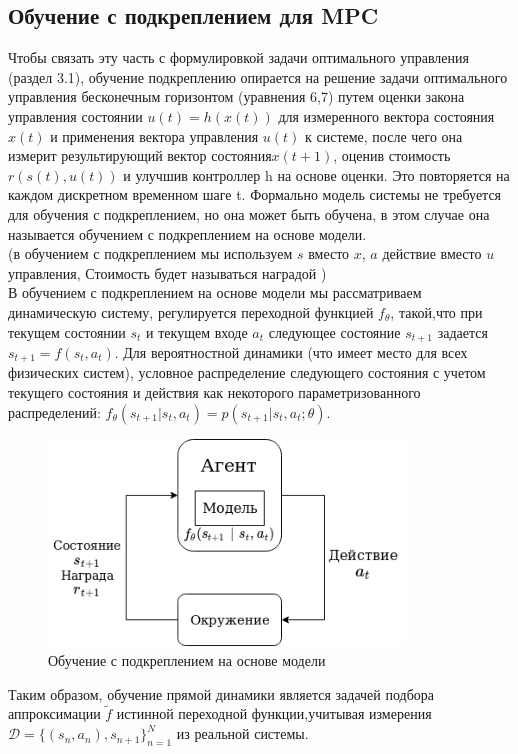 \documentclass[a4paper,12pt]{article}
\begin{document}
\subsection{Обучение с подкреплением для MPC}
Чтобы связать эту часть с формулировкой задачи оптимального управления (раздел 3.1), обучение подкреплению опирается на решение задачи оптимального управления бесконечным горизонтом (уравнения 6,7) путем оценки закона управления состоянии $u(t)=h(x(t))$ для измеренного вектора состояния $x(t)$ и применения вектора управления $u(t)$ к системе, после чего она измерит результирующий вектор состояния$x(t+1)$, оценив стоимость $r(s(t), u(t))$ и улучшив контроллер h на основе оценки. Это повторяется на каждом дискретном временном шаге t. Формально модель системы не требуется для обучения с подкреплением, но она может быть обучена, в этом случае она называется обучением с подкреплением на основе модели.\\
(в обучением с подкреплением мы используем $s$ вместо $x$, $a$ действие вместо $u$ управления, Стоимость будет называться наградой )\\

В обучением с подкреплением на основе модели мы рассматриваем динамическую систему, регулируется переходной функцией $f_\theta$, такой,что при текущем состоянии $s_t$ и текущем входе $a_t$ следующее состояние $s_{t+1}$ задается $s_{t+1}=f(s_t, a_t)$. Для вероятностной динамики (что имеет место для всех физических систем), условное распределение следующего состояния с учетом текущего состояния и действия как некоторого параметризованного распределений: $f_\theta(s_{t+1}|s_t , a_t)=p(s_{t+1}|s_t,a_t;\theta)$.\\
\begin{figure}[H]
    \centering
    \includegraphics[height=5.5cm]{img/MBRL_ru.png}
    \caption{Обучение с подкреплением на основе модели}
    \label{fig:my_label}
\end{figure}
Таким образом, обучение прямой динамики является задачей подбора аппроксимации $\tilde{f}$ истинной переходной функции,учитывая измерения $\mathcal{D}=\{(s_n,a_n), s_{n+1}\}_{n=1}^N$ из реальной системы.\\
\end{document}
